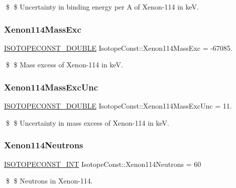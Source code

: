 \$ \$ Uncertainty in binding energy per A of Xenon-\/114 in keV. \mbox{\label{group___isotope_const-_xenon-_xe114_gac65039c07a4e10522f382cb07c576dcc}} 
\subsubsection{\texorpdfstring{Xenon114\+Mass\+Exc}{Xenon114MassExc}}
{\footnotesize\ttfamily \mbox{\hyperlink{group___isotope_const-_macros_ga8f45a7272ce02c0b4c65c44636ed719a}{I\+S\+O\+T\+O\+P\+E\+C\+O\+N\+S\+T\+\_\+\+D\+O\+U\+B\+LE}} Isotope\+Const\+::\+Xenon114\+Mass\+Exc = -\/67085.}

\$ \$ Mass excess of Xenon-\/114 in keV. \mbox{\label{group___isotope_const-_xenon-_xe114_ga30c3e4c603d6e3e4a0d991af37845d2c}} 
\subsubsection{\texorpdfstring{Xenon114\+Mass\+Exc\+Unc}{Xenon114MassExcUnc}}
{\footnotesize\ttfamily \mbox{\hyperlink{group___isotope_const-_macros_ga8f45a7272ce02c0b4c65c44636ed719a}{I\+S\+O\+T\+O\+P\+E\+C\+O\+N\+S\+T\+\_\+\+D\+O\+U\+B\+LE}} Isotope\+Const\+::\+Xenon114\+Mass\+Exc\+Unc = 11.}

\$ \$ Uncertainty in mass excess of Xenon-\/114 in keV. \mbox{\label{group___isotope_const-_xenon-_xe114_gab45a6308fd9d01361efa4d243e7f8fbb}} 
\subsubsection{\texorpdfstring{Xenon114\+Neutrons}{Xenon114Neutrons}}
{\footnotesize\ttfamily \mbox{\hyperlink{group___isotope_const-_macros_ga5f18360b3e99483a35c32d789e62621c}{I\+S\+O\+T\+O\+P\+E\+C\+O\+N\+S\+T\+\_\+\+I\+NT}} Isotope\+Const\+::\+Xenon114\+Neutrons = 60}

\$ \$ Neutrons in Xenon-\/114. \mbox{\label{group___isotope_const-_xenon-_xe114_gace0e9e96f2f571748b4297285ce7cbc2}} 

